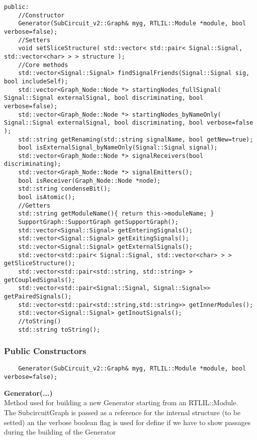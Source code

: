 \documentclass{article}
\begin{document}
\begin{mdframed}[hidealllines=true, backgroundcolor=magenta!10]
	\begin{lstlisting}[basicstyle=\tiny]
public:
	//Constructor
	Generator(SubCircuit_v2::Graph& myg, RTLIL::Module *module, bool verbose=false);
	//Setters
	void setSliceStructure( std::vector< std::pair< Signal::Signal, std::vector<char> > > structure );
	//Core methods
	std::vector<Signal::Signal> findSignalFriends(Signal::Signal sig, bool includeSelf);
	std::vector<Graph_Node::Node *> startingNodes_fullSignal( Signal::Signal externalSignal, bool discriminating, bool verbose=false);
	std::vector<Graph_Node::Node *> startingNodes_byNameOnly( Signal::Signal externalSignal, bool discriminating, bool verbose=false );
	std::string getRenaming(std::string signalName, bool getNew=true);
	bool isExternalSignal_byNameOnly(Signal::Signal signal);
	std::vector<Graph_Node::Node *> signalReceivers(bool discriminating);
	std::vector<Graph_Node::Node *> signalEmitters();
	bool isReceiver(Graph_Node::Node *node);
	std::string condenseBit();
	bool isAtomic();
	//Getters
	std::string getModuleName(){ return this->moduleName; }
	SupportGraph::SupportGraph getSupportGraph();
	std::vector<Signal::Signal> getEnteringSignals();
	std::vector<Signal::Signal> getExitingSignals();
	std::vector<Signal::Signal> getExternalSignals();
	std::vector<std::pair< Signal::Signal, std::vector<char> > > getSliceStructure();
	std::vector<std::pair<std::string, std::string> > getCoupledSignals();
	std::vector<std::pair<Signal::Signal, Signal::Signal>> getPairedSignals();
	std::vector<std::pair<std::string,std::string>> getInnerModules();
	std::vector<Signal::Signal> getInoutSignals();
	//toString()
	std::string toString();
	\end{lstlisting}
\end{mdframed}

\subsubsection{Public Constructors}

\begin{mdframed}[hidealllines=true, backgroundcolor=magenta!10]
	\begin{lstlisting}
	Generator(SubCircuit_v2::Graph& myg, RTLIL::Module *module, bool verbose=false);
	\end{lstlisting}
\end{mdframed}

\textbf{Generator(...)}\\
Method used for building a new Generator starting from an RTLIL::Module.\\
The SubcircuitGraph is passed as a reference for the internal structure (to be setted) an the verbose boolean flag is
used for define if we have to show passages during the building of the Generator\\\\
\end{document}
